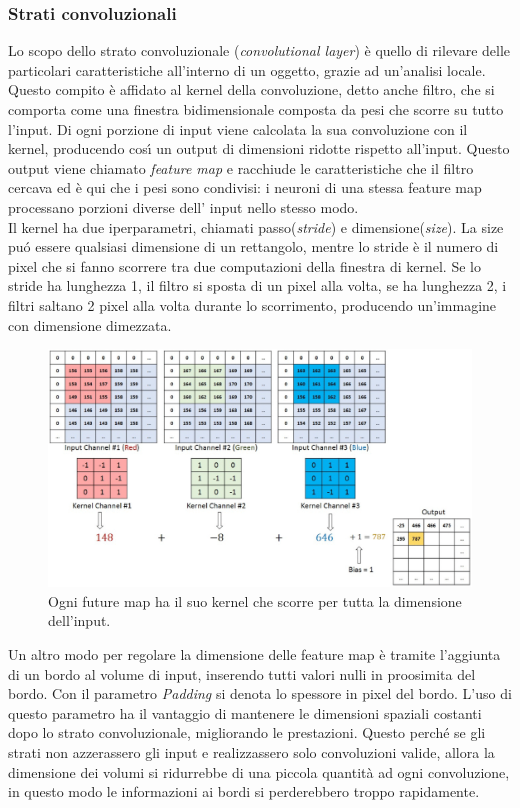 \documentclass[a4paper,12pt,oneside]{book}
\begin{document}
\subsubsection{Strati convoluzionali}
Lo scopo dello strato convoluzionale (\textit{convolutional layer}) \`e quello di rilevare delle particolari caratteristiche all'interno di un oggetto, grazie ad un'analisi locale. Questo compito \`e affidato al kernel della convoluzione, detto anche filtro, che si comporta come una finestra bidimensionale composta da pesi che scorre su tutto l'input. Di ogni porzione di input viene calcolata la sua convoluzione con il kernel, producendo cos\'{\i} un output di dimensioni ridotte rispetto all'input. Questo output viene chiamato \textit{feature map} e racchiude le caratteristiche che il filtro cercava ed \`e qui che i pesi sono condivisi: i neuroni di una stessa feature map processano porzioni diverse dell' input nello stesso modo.\\
Il kernel ha due iperparametri, chiamati passo(\textit{stride}) e dimensione(\textit{size}). La size  pu\'{o} essere qualsiasi dimensione di un rettangolo, mentre lo stride \`e il numero di pixel che si fanno scorrere tra due computazioni della finestra di kernel. Se lo stride ha lunghezza 1, il filtro si sposta di un pixel alla volta, se ha lunghezza 2, i filtri saltano 2 pixel alla volta durante lo scorrimento, producendo un'immagine con dimensione dimezzata.
\newpage
\begin{figure}[!ht]
\centering
\includegraphics[scale=0.5]{finestra}
\caption{Ogni future map ha il suo kernel che scorre per tutta la dimensione dell'input.}
\end{figure}
Un altro modo per regolare la dimensione delle feature map \`e tramite l'aggiunta di un bordo al volume di input, inserendo tutti valori nulli in proosimita del bordo. Con il parametro \textit{Padding} si denota lo spessore in pixel del bordo. L'uso di questo parametro ha il vantaggio di mantenere le dimensioni spaziali costanti dopo lo strato convoluzionale, migliorando le prestazioni. Questo perch\'{e} se gli strati non azzerassero gli input e realizzassero solo convoluzioni valide, allora la dimensione dei volumi si ridurrebbe di una piccola quantit\`{a} ad ogni convoluzione, in questo modo le informazioni ai bordi si perderebbero troppo rapidamente.\\
\end{document}
